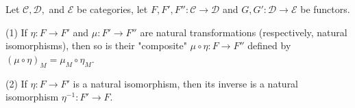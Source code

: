 Let $\mathcal{C}, \mathcal{D},$ and $\mathcal{E}$ be categories, let $F, F', F'': \mathcal{C} \to \mathcal{D}$ and $G, G': \mathcal{D} \to \mathcal{E}$ be functors.

(1) If $\eta: F \to F'$ and $\mu: F' \to F''$ are natural transformations (respectively, natural isomorphisms), then so is their "composite" $\mu \circ \eta: F \to F''$ defined by $(\mu \circ \eta)_M = \mu_M \circ \eta_M$.

(2) If $\eta: F \to F'$ is a natural isomorphism, then its inverse is a natural isomorphism $\eta^{-1}: F' \to F$.
